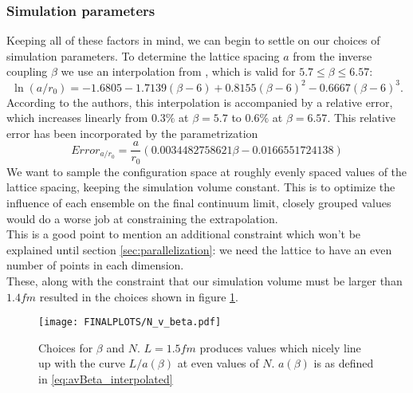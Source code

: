 \documentclass[a4paper,10pt]{article}
\begin{document}
\subsubsection{Simulation parameters}
Keeping all of these factors in mind, we can begin to settle on our choices of simulation parameters.
To determine the lattice spacing $a$ from the inverse coupling $\beta$ we use an interpolation from \cite{Guagnelli_1998}, which is valid for $5.7 \leq \beta \leq 6.57$:
\begin{equation}\label{eq:avBeta_interpolated}
\ln \left(a / r_{0}\right)=-1.6805-1.7139(\beta-6)+0.8155(\beta-6)^{2}-0.6667(\beta-6)^{3}.
\end{equation}
According to the authors, this interpolation is accompanied by a relative error, which increases linearly from $0.3\%$ at $\beta = 5.7$ to $0.6\%$ at $\beta = 6.57$. This relative error has been incorporated by the parametrization 
\begin{equation}
Error_{a/r_0} = \frac{a}{r_0}(0.0034482758621\beta - 0.0166551724138)
\end{equation}
We want to sample the configuration space at roughly evenly spaced values of the lattice spacing, keeping the simulation volume constant. This is to optimize the influence of each ensemble on the final continuum limit, closely grouped values would do a worse job at constraining the extrapolation.\\This is a good point to mention an additional constraint which won't be explained until section \ref{sec:parallelization}: we need the lattice to have an even number of points in each dimension.\\These, along with the constraint that our simulation volume must be larger than $1.4fm$ resulted in the choices shown in figure \ref{fig:choosingBetasAndLambdas}.
\begin{figure}[H]
\centering
\texttt{[image: FINALPLOTS/N\_v\_beta.pdf]}
\caption[]{Choices for $\beta$ and $N$. $L=1.5fm$ produces values which nicely line up with the curve $L/a(\beta)$ at even values of $N$. $a(\beta)$ is as defined in \eqref{eq:avBeta_interpolated}}\label{fig:choosingBetasAndLambdas}
\end{figure}
\end{document}
